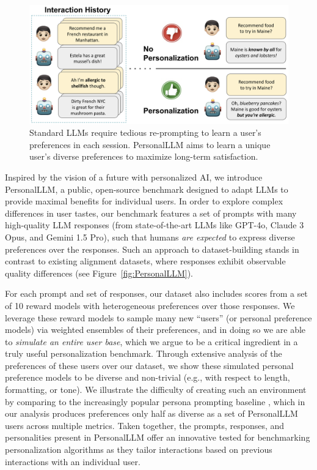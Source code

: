 \begin{figure}[t]
    \centering
    \includegraphics[width=\textwidth]{../figures/fig1.png}
    \caption{
    Standard LLMs require tedious re-prompting to learn a user’s preferences in each session. \textsf{PersonalLLM} aims to learn a unique user's diverse preferences to maximize long-term satisfaction.}
    \label{fig:main_figure}
\end{figure}

Inspired by the vision of a future with personalized AI, we introduce \textsf{PersonalLLM}, a public, open-source benchmark designed to adapt LLMs to provide maximal benefits for individual users. In order to explore complex differences in user tastes, our benchmark features a set of prompts with many high-quality LLM responses (from state-of-the-art LLMs like GPT-4o, Claude 3 Opus, and Gemini 1.5 Pro), such that humans \textit{are expected} to express diverse preferences over the responses.
Such an approach to dataset-building stands in contrast to existing alignment datasets, where responses exhibit observable quality differences (see Figure~\ref{fig:PersonalLLM}).

For each prompt and set of responses, our dataset also includes scores from a set of 10 reward models with heterogeneous preferences over those responses.
We leverage these reward models to sample many new ``users'' (or personal preference models) via weighted ensembles of their preferences, and in doing so we are able to \textit{simulate an entire user base}, which we argue to be a critical ingredient in a truly useful personalization benchmark.  
Through extensive analysis of the preferences of these users over our dataset, we show these simulated personal preference models to be diverse and non-trivial (e.g., with respect to length, formatting, or tone). We illustrate the difficulty of creating such an environment by comparing to the increasingly popular persona prompting baseline \citep{castricato2024personareproducibletestbedpluralistic, chan2024scalingsyntheticdatacreation, jang2023personalizedsoupspersonalizedlarge}, which in our analysis produces preferences only half as diverse as a set of \textsf{PersonalLLM} users across multiple metrics.
Taken together, the prompts, responses, and personalities present in \textsf{PersonalLLM} offer an innovative tested for benchmarking personalization algorithms as they tailor interactions based on previous interactions with an individual user.

